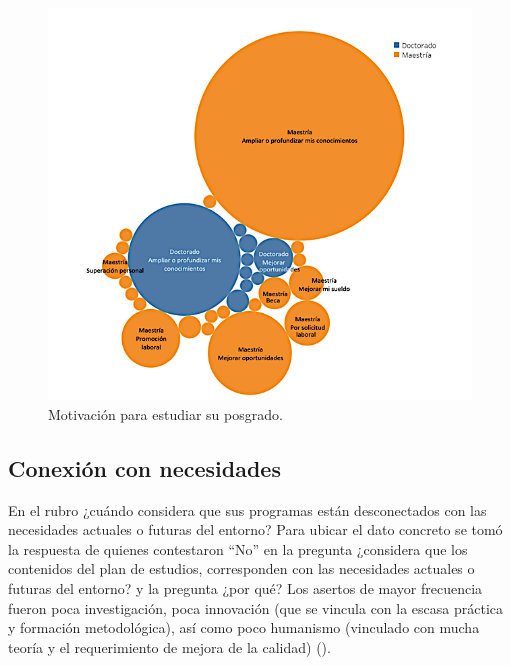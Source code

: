\documentclass[spanish]{textolivre}
\begin{document}
\begin{figure}[htbp]
 \hspace*{-1.3in}
 \includegraphics[width=1.22\textwidth]{Fig2.png}
 \caption{Motivación para estudiar su posgrado.}
 \label{fig2}
\end{figure}

\subsection{Conexión con necesidades}\label{sec-idioma}
En el rubro ¿cuándo considera que sus programas están desconectados con las necesidades actuales o futuras del entorno? Para ubicar el dato concreto se tomó la respuesta de quienes contestaron “No” en la pregunta ¿considera que los contenidos del plan de estudios, corresponden con las necesidades actuales o futuras del entorno? y la pregunta  ¿por qué? Los asertos de mayor frecuencia fueron poca investigación, poca innovación (que se vincula con la escasa práctica y formación metodológica), así como poco humanismo (vinculado con mucha teoría y el requerimiento de mejora de la calidad) ().
\end{document}
